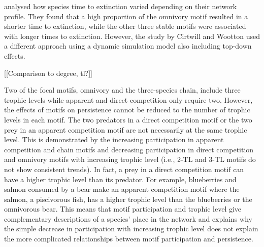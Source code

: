 \documentclass[12pt]{article}
\begin{document}
\begin{spacing}{2.0}
 \cite{Cirtwill2021_inprep} analysed how species time to extinction varied depending on their network profile. They found that a high proportion of the omnivory motif resulted in a shorter time to extinction, while the other three stable motifs were associated with longer times to extinction. However, the study by Cirtwill and Wootton used a different approach using a dynamic simulation model also including top-down effects. 


    
    
    
    
[[Comparison to degree, tl?]]

    Two of the focal motifs, omnivory and the three-species chain, include three trophic levels while apparent and direct competition only require two.
    However, the effects of motifs on persistence cannot be reduced to the number of trophic levels in each motif.
    The two predators in a direct competition motif or the two prey in an apparent competition motif are not necessarily at the same trophic level. This is demonstrated by the increasing participation in apparent competition and chain motifs and decreasing participation in direct competition and omnivory motifs with increasing trophic level (i.e., 2-TL and 3-TL motifs do not show consistent trends).
    In fact, a prey in a direct competition motif can have a higher trophic level than its predator.
    For example, blueberries and salmon consumed by a bear make an apparent competition motif where the salmon, a piscivorous fish, has a higher trophic level than the blueberries or the omnivorous bear.
    This means that motif participation and trophic level give complementary descriptions of a species' place in the network and explains why the simple decrease in participation with increasing trophic level does not explain the more complicated relationships between motif participation and persistence.
    

\end{spacing}
\end{document}

